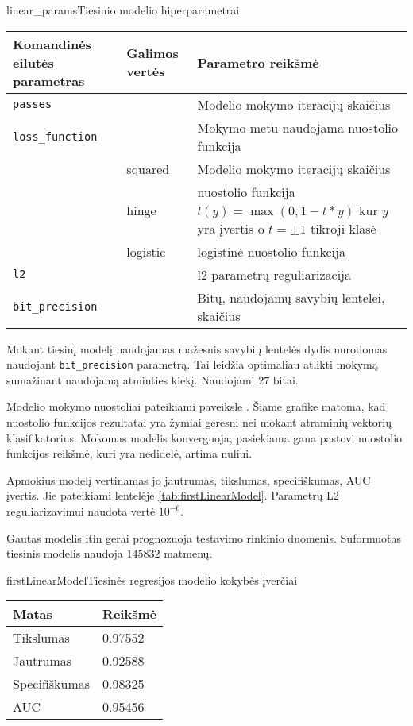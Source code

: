 \begin{ktutable}{linear_params}{Tiesinio modelio hiperparametrai}
    \begin{tabular}{| l | l | p{7cm}|}
    \hline
        Komandinės eilutės parametras & Galimos vertės & Parametro reikšmė\\ \hline
        \texttt{passes} &  & Modelio mokymo iteracijų skaičius \\ \hline
        \texttt{loss\_function} &          & Mokymo metu naudojama nuostolio funkcija \\
                               & squared  & Modelio mokymo iteracijų skaičius \\
                               & hinge    & nuostolio funkcija $l(y) = \max(0, 1 - t * y)$ kur $y$ yra įvertis o $t = \pm 1$ tikroji klasė  \\
                               & logistic & logistinė nuostolio funkcija \\ \hline
        \texttt{l2} & & l2 parametrų reguliarizacija \\ \hline
        \texttt{bit\_precision} & & Bitų, naudojamų savybių lentelei, skaičius\\ \hline
    \end{tabular}
\end{ktutable}

Mokant tiesinį modelį naudojamas mažesnis savybių lentelės dydis nurodomas naudojant \texttt{bit\_precision}
 parametrą. Tai leidžia optimaliau atlikti mokymą sumažinant naudojamą atminties kiekį. Naudojami $27$ bitai.

Modelio mokymo nuostoliai pateikiami paveiksle . Šiame grafike
matoma, kad nuostolio funkcijos rezultatai yra žymiai geresni nei mokant atraminių vektorių klasifikatorius. Mokomas modelis konverguoja, pasiekiama gana pastovi nuostolio funkcijos reikšmė, kuri
yra nedidelė, artima nuliui.


Apmokius modelį vertinamas jo jautrumas, tikslumas, specifiškumas, AUC įvertis. Jie pateikiami
lentelėje \vref{tab:firstLinearModel}. Parametrų L2 reguliarizavimui naudota vertė $10^{-6}$.

Gautas modelis itin gerai prognozuoja testavimo rinkinio duomenis. Suformuotas tiesinis modelis naudoja
$145832$ matmenų.

\begin{ktutable}{firstLinearModel}{Tiesinės regresijos modelio kokybės įverčiai}
    \begin{tabular}{| l | l |}
    \hline
       Matas & Reikšmė \\ \hline
               Tikslumas & 0.97552 \\ \hline
               Jautrumas & 0.92588 \\ \hline
               Specifiškumas & 0.98325 \\ \hline
               AUC & 0.95456 \\ \hline
    \end{tabular}
\end{ktutable}

